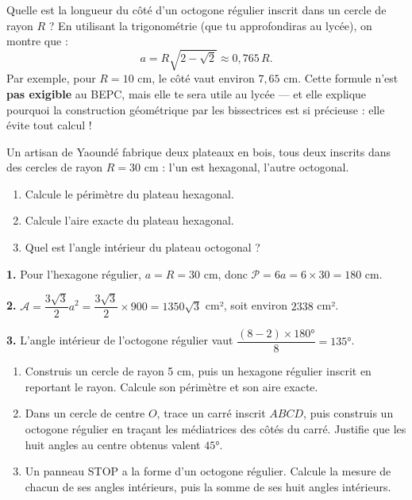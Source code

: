 \documentclass[11pt]{article}
\newcounter{popsec}
\newcounter{popsub}
\newcommand{\courssub}[1]{%
  \stepcounter{popsub}%
  \par\vspace{9pt}\noindent{\popxbold\fontsize{11.5}{13}\selectfont\color{popink}{\color{poporange}\thepopsec.\thepopsub}\hspace{6pt}#1}\par\nopagebreak\vspace{4pt}
}
\begin{document}
\begin{savaistu}
Quelle est la longueur du côté d'un octogone régulier inscrit dans un cercle de rayon $R$ ? En utilisant la trigonométrie (que tu approfondiras au lycée), on montre que :
\[ a = R\sqrt{2 - \sqrt{2}} \approx 0,765\,R. \]
Par exemple, pour $R = 10$ cm, le côté vaut environ $7,65$ cm. Cette formule n'est \textbf{pas exigible} au BEPC, mais elle te sera utile au lycée — et elle explique pourquoi la construction géométrique par les bissectrices est si précieuse : elle évite tout calcul !
\end{savaistu}

\courssub{Exercice de synthèse}

\begin{exoresolu}
Un artisan de Yaoundé fabrique deux plateaux en bois, tous deux inscrits dans des cercles de rayon $R = 30$ cm : l'un est hexagonal, l'autre octogonal.
\begin{enumerate}
\item Calcule le périmètre du plateau hexagonal.
\item Calcule l'aire exacte du plateau hexagonal.
\item Quel est l'angle intérieur du plateau octogonal ?
\end{enumerate}
\tcblower
\textbf{1.} Pour l'hexagone régulier, $a = R = 30$ cm, donc $\mathcal{P} = 6a = 6 \times 30 = 180$ cm.

\textbf{2.} $\mathcal{A} = \dfrac{3\sqrt{3}}{2}a^2 = \dfrac{3\sqrt{3}}{2} \times 900 = 1350\sqrt{3}$ cm², soit environ $2338$ cm².

\textbf{3.} L'angle intérieur de l'octogone régulier vaut $\dfrac{(8-2)\times 180°}{8} = 135°$.
\end{exoresolu}

\begin{exercice}
\begin{enumerate}
\item Construis un cercle de rayon 5 cm, puis un hexagone régulier inscrit en reportant le rayon. Calcule son périmètre et son aire exacte.
\item Dans un cercle de centre $O$, trace un carré inscrit $ABCD$, puis construis un octogone régulier en traçant les médiatrices des côtés du carré. Justifie que les huit angles au centre obtenus valent $45°$.
\item Un panneau STOP a la forme d'un octogone régulier. Calcule la mesure de chacun de ses angles intérieurs, puis la somme de ses huit angles intérieurs.
\end{enumerate}
\end{exercice}
\end{document}
